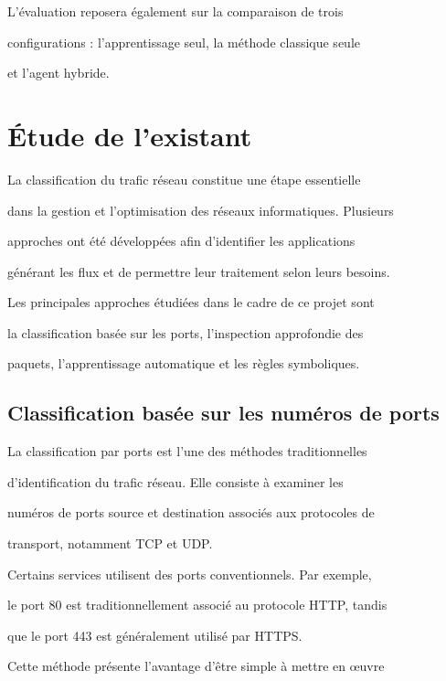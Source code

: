 L'évaluation reposera également sur la comparaison de trois

configurations : l'apprentissage seul, la méthode classique seule

et l'agent hybride.





\section{Étude de l'existant}



La classification du trafic réseau constitue une étape essentielle

dans la gestion et l'optimisation des réseaux informatiques. Plusieurs

approches ont été développées afin d'identifier les applications

générant les flux et de permettre leur traitement selon leurs besoins.



Les principales approches étudiées dans le cadre de ce projet sont

la classification basée sur les ports, l'inspection approfondie des

paquets, l'apprentissage automatique et les règles symboliques.



\subsection{Classification basée sur les numéros de ports}



La classification par ports est l'une des méthodes traditionnelles

d'identification du trafic réseau. Elle consiste à examiner les

numéros de ports source et destination associés aux protocoles de

transport, notamment TCP et UDP.



Certains services utilisent des ports conventionnels. Par exemple,

le port 80 est traditionnellement associé au protocole HTTP, tandis

que le port 443 est généralement utilisé par HTTPS.



Cette méthode présente l'avantage d'être simple à mettre en œuvre


